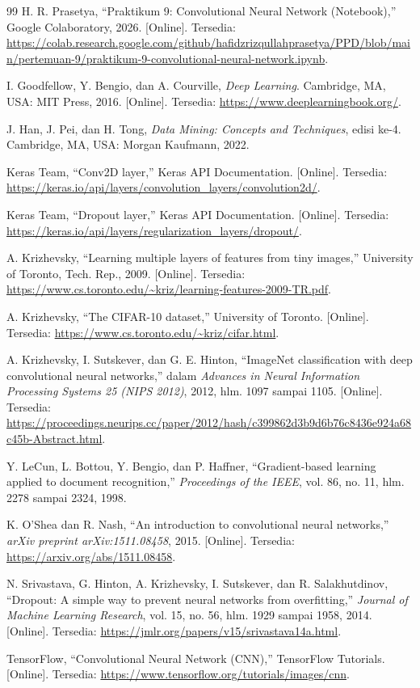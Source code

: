 \documentclass[a4paper,oneside,12pt]{report}
\begin{document}
\begin{thebibliography}{99}
	 H. R. Prasetya, ``Praktikum 9: Convolutional Neural Network (Notebook),'' Google Colaboratory, 2026. [Online]. Tersedia: \url{https://colab.research.google.com/github/hafidzrizqullahprasetya/PPD/blob/main/pertemuan-9/praktikum-9-convolutional-neural-network.ipynb}.

	 I. Goodfellow, Y. Bengio, dan A. Courville, \textit{Deep Learning}. Cambridge, MA, USA: MIT Press, 2016. [Online]. Tersedia: \url{https://www.deeplearningbook.org/}.

	 J. Han, J. Pei, dan H. Tong, \textit{Data Mining: Concepts and Techniques}, edisi ke-4. Cambridge, MA, USA: Morgan Kaufmann, 2022.

	 Keras Team, ``Conv2D layer,'' Keras API Documentation. [Online]. Tersedia: \url{https://keras.io/api/layers/convolution_layers/convolution2d/}.

	 Keras Team, ``Dropout layer,'' Keras API Documentation. [Online]. Tersedia: \url{https://keras.io/api/layers/regularization_layers/dropout/}.

	 A. Krizhevsky, ``Learning multiple layers of features from tiny images,'' University of Toronto, Tech. Rep., 2009. [Online]. Tersedia: \url{https://www.cs.toronto.edu/~kriz/learning-features-2009-TR.pdf}.

	 A. Krizhevsky, ``The CIFAR-10 dataset,'' University of Toronto. [Online]. Tersedia: \url{https://www.cs.toronto.edu/~kriz/cifar.html}.

	 A. Krizhevsky, I. Sutskever, dan G. E. Hinton, ``ImageNet classification with deep convolutional neural networks,'' dalam \textit{Advances in Neural Information Processing Systems 25 (NIPS 2012)}, 2012, hlm. 1097 sampai 1105. [Online]. Tersedia: \url{https://proceedings.neurips.cc/paper/2012/hash/c399862d3b9d6b76c8436e924a68c45b-Abstract.html}.

	 Y. LeCun, L. Bottou, Y. Bengio, dan P. Haffner, ``Gradient-based learning applied to document recognition,'' \textit{Proceedings of the IEEE}, vol. 86, no. 11, hlm. 2278 sampai 2324, 1998.

	 K. O'Shea dan R. Nash, ``An introduction to convolutional neural networks,'' \textit{arXiv preprint arXiv:1511.08458}, 2015. [Online]. Tersedia: \url{https://arxiv.org/abs/1511.08458}.

	 N. Srivastava, G. Hinton, A. Krizhevsky, I. Sutskever, dan R. Salakhutdinov, ``Dropout: A simple way to prevent neural networks from overfitting,'' \textit{Journal of Machine Learning Research}, vol. 15, no. 56, hlm. 1929 sampai 1958, 2014. [Online]. Tersedia: \url{https://jmlr.org/papers/v15/srivastava14a.html}.

	 TensorFlow, ``Convolutional Neural Network (CNN),'' TensorFlow Tutorials. [Online]. Tersedia: \url{https://www.tensorflow.org/tutorials/images/cnn}.
\end{thebibliography}
\end{document}
